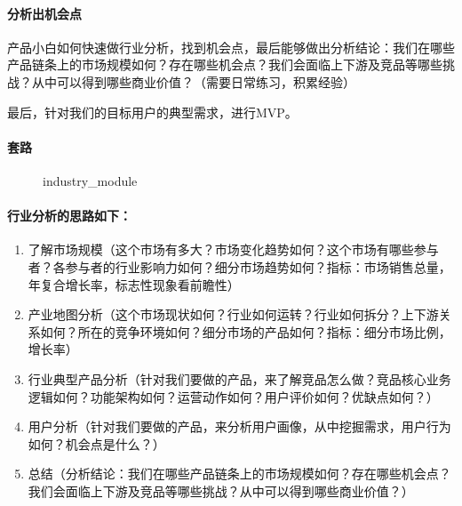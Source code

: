 \documentclass[letterpaper,11pt,english]{sphinxmanual}
\begin{document}
\paragraph{分析出机会点}
\label{\detokenize{chapter_skill/industry_analysis:id3}}
产品小白如何快速做行业分析，找到机会点，最后能够做出分析结论：我们在哪些产品链条上的市场规模如何？存在哪些机会点？我们会面临上下游及竞品等哪些挑战？从中可以得到哪些商业价值？（需要日常练习，积累经验）

最后，针对我们的目标用户的典型需求，进行MVP。


\paragraph{套路}
\label{\detokenize{chapter_skill/industry_analysis:id4}}
\begin{figure}[H]
\centering
\capstart

\noindent{}
\caption{industry\_module}\label{\detokenize{chapter_skill/industry_analysis:id13}}\end{figure}


\paragraph{行业分析的思路如下：}
\label{\detokenize{chapter_skill/industry_analysis:id5}}\begin{enumerate}
%
\item {} 
了解市场规模（这个市场有多大？市场变化趋势如何？这个市场有哪些参与者？各参与者的行业影响力如何？细分市场趋势如何？指标：市场销售总量，年复合增长率，标志性现象看前瞻性）

\item {} 
产业地图分析（这个市场现状如何？行业如何运转？行业如何拆分？上下游关系如何？所在的竞争环境如何？细分市场的产品如何？指标：细分市场比例，增长率）

\item {} 
行业典型产品分析（针对我们要做的产品，来了解竞品怎么做？竞品核心业务逻辑如何？功能架构如何？运营动作如何？用户评价如何？优缺点如何？）

\item {} 
用户分析（针对我们要做的产品，来分析用户画像，从中挖掘需求，用户行为如何？机会点是什么？）

\item {} 
总结（分析结论：我们在哪些产品链条上的市场规模如何？存在哪些机会点？我们会面临上下游及竞品等哪些挑战？从中可以得到哪些商业价值？）

\end{enumerate}
\end{document}
